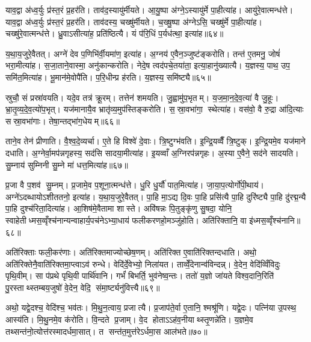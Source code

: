 याव॒द्वा अ॑ध्व॒र्युः प्र॑स्त॒रं प्र॒हर॑ति। ताव॑द॒स्यायु॑र्मीयते। आ॒यु॒ष्पा अ॑ग्ने॒ऽस्यायु॑र्मे पा॒हीत्या॑ह। आयु॑रे॒वात्मन्ध॑त्ते। याव॒द्वा अ॑ध्व॒र्युः प्र॑स्त॒रं प्र॒हर॑ति। ताव॑दस्य॒ चख्षु॑र्मीयते। च॒ख्षु॒ष्पा अ॑ग्नेऽसि॒ चख्षु॑र्मे पा॒हीत्या॑ह। चख्षु॑रे॒वात्मन्ध॑त्ते। ध्रु॒वाऽसीत्या॑ह॒ प्रति॑ष्ठित्यै। यं प॑रि॒धिं प॒र्यध॑त्था॒ इत्या॑ह॥६४॥

य॒था॒य॒जुरे॒वैतत्। अग्ने॑ देव प॒णिभि॑र्वी॒यमा॑ण॒ इत्या॑ह। अ॒ग्नय॑ ए॒वैन॒ञ्जुष्ट॑ङ्करोति। तन्त॑ ए॒तमनु॒ जोषं॑ भरा॒मीत्या॑ह। स॒जा॒ताने॒वास्मा॒ अनु॑कान्करोति। नेदे॒ष त्वद॑पचे॒तया॑ता॒ इत्या॒हानु॑ख्यात्यै। य॒ज्ञस्य॒ पाथ॒ उप॒ समि॑त॒मित्या॑ह। भू॒मान॑मे॒वोपै॑ति। प॒रि॒धीन्प्र ह॑रति। य॒ज्ञस्य॒ समि॑ष्ट्यै॥६५॥

स्रुचौ॒ सं प्रस्रा॑वयति। यदे॒व तत्र॑ क्रू॒रम्। तत्तेन॑ शमयति। जु॒ह्वामु॑प॒भृतम्। य॒ज॒मा॒न॒दे॒व॒त्या॑ वै जु॒हूः। भ्रा॒तृ॒व्य॒दे॒व॒त्यो॑प॒भृत्। यज॑मानायै॒व भ्रातृ॑व्य॒मुप॑स्तिङ्करोति। स॒स्रा॒वभा॑गा॒ स्थेत्या॑ह। वस॑वो॒ वै रु॒द्रा आ॑दि॒त्याः सस्रा॒वभा॑गाः। तेषा॒न्तद्भा॑ग॒धेयम्॥६६॥

ताने॒व तेन॑ प्रीणाति। वै॒श्व॒दे॒व्यर्चा। ए॒ते हि विश्वे॑ दे॒वाः। त्रि॒ष्टुग्भ॑वति। इ॒न्द्रि॒यव्वैँ त्रि॒ष्टुक्। इ॒न्द्रि॒यमे॒व यज॑माने दधाति। अ॒ग्नेर्वा॒मप॑न्नगृहस्य॒ सद॑सि सादया॒मीत्या॑ह। इ॒यव्वाँ अ॒ग्निरप॑न्नगृहः। अ॒स्या ए॒वैने॒ सद॑ने सादयति। सु॒म्नाय॑ सुम्निनी सु॒म्ने मा॑ धत्त॒मित्या॑ह॥६७॥

प्र॒जा वै प॒शव॑ सु॒म्नम्। प्र॒जामे॒व प॒शूना॒त्मन्ध॑त्ते। धु॒रि धु॒र्यौ॑ पात॒मित्या॑ह। जा॒या॒प॒त्योर्गो॑पी॒थाय॑। अग्ने॑ऽदब्धायोऽशीततनो॒ इत्या॑ह। य॒था॒य॒जुरे॒वैतत्। पा॒हि मा॒ऽद्य दि॒वः पा॒हि प्रसि॑त्यै पा॒हि दुरि॑ष्ट्यै पा॒हि दु॑रद्म॒न्यै पा॒हि दुश्च॑रिता॒दित्या॑ह। आ॒शिष॑मे॒वैतामा शास्ते। अवि॑षन्नः पि॒तुङ्कृ॑णु सु॒षदा॒ योनि॒ स्वाहेतीध्मस॒व्वृँश्च॑नान्यन्वाहार्य॒पच॑नेऽभ्या॒धाय॑ फलीकरणहो॒मञ्जु॑होति। अति॑रिक्तानि॒ वा इ॑ध्मस॒व्वृँश्च॑नानि॥६८॥

अति॑रिक्ताः फली॒कर॑णाः। अति॑रिक्तमाज्योच्छेष॒णम्। अति॑रिक्त ए॒वाति॑रिक्तन्दधाति। अथो॒ अति॑रिक्तेनै॒वाति॑रिक्तमा॒प्त्वाऽव॑ रुन्धे। वेदि॑र्दे॒वेभ्यो॒ निला॑यत। ताव्वेँ॒देनान्व॑विन्दन्न्। वे॒देन॒ वेदि॑व्विँविदुः पृथि॒वीम्। सा प॑प्रथे पृथि॒वी पार्थि॑वानि। गर्भं॑ बिभर्ति॒ भुव॑नेष्व॒न्तः। ततो॑ य॒ज्ञो जा॑यते विश्व॒दानि॒रिति॑ पु॒रस्ताथ्स्तम्बय॒जुषो॑ वे॒देन॒ वेदि॒ संमा॒र्ष्ट्यनु॑वित्त्यै॥६९॥

अथो॒ यद्वे॒दश्च॒ वेदि॑श्च॒ भव॑तः। मि॒थु॒न॒त्वाय॒ प्रजात्यै। प्र॒जाप॑ते॒र्वा ए॒तानि॒ श्मश्रू॑णि। यद्वे॒दः। पत्नि॑या उ॒पस्थ॒ आस्य॑ति। मि॒थु॒नमे॒व क॑रोति। वि॒न्दते प्र॒जाम्। वे॒द होताऽऽह॑व॒नीयाथ्स्तृ॒णन्ने॑ति। य॒ज्ञमे॒व तथ्सन्त॑नो॒त्योत्त॑रस्मादर्धमा॒सात्। त सन्त॑त॒मुत्त॑रेऽर्धमा॒स आल॑भते॥७०॥

